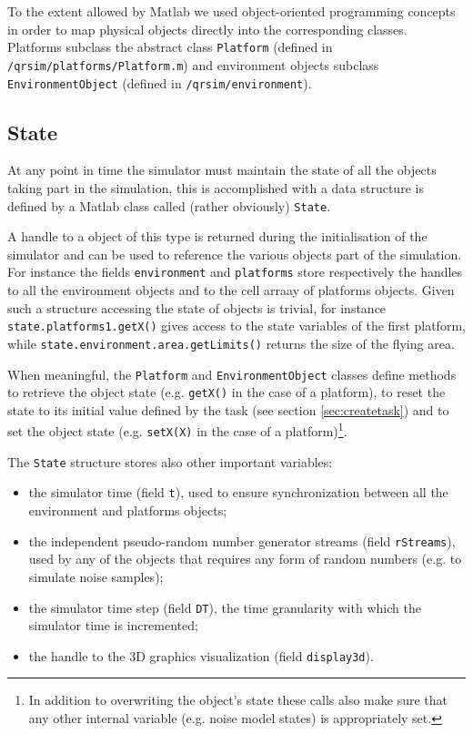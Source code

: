 \documentclass[a4paper,11pt]{report}
\begin{document}
To the extent allowed by Matlab we used object-oriented programming concepts in order to map physical objects directly into the corresponding classes. Platforms subclass the abstract class \texttt{Platform} (defined in \texttt{/qrsim/platforms/Platform.m}) and environment objects subclass \texttt{EnvironmentObject} (defined in \texttt{/qrsim/environment}).

\subsection{State}\label{sec:state}

At any point in time the simulator must maintain the state of all the objects taking part in the simulation, this is accomplished with a data structure is defined by a Matlab class called (rather obviously) \texttt{State}.
 
A handle to a object of this type is returned during the initialisation of the simulator and can be used to reference the various objects part of the simulation. For instance the fields \texttt{environment} and \texttt{platforms} store respectively the handles to all the environment objects and to the cell arraay of platforms objects. 
Given such a structure accessing the state of objects is trivial, for instance \texttt{state.platforms{1}.getX()} gives access to the state variables of the first platform, while \texttt{state.environment.area.getLimits()} returns the size of the flying area. 

When meaningful, the \texttt{Platform} and \texttt{EnvironmentObject} classes define methods to retrieve the object state (e.g. \texttt{getX()} in the case of a platform), to reset the state to its initial value defined by the task (see section \ref{sec:createtask}) and to set the object state (e.g. \texttt{setX(X)} in the case of a platform)\footnote{In addition to overwriting the object's state these calls also make sure that any other internal variable (e.g. noise model states) is appropriately set.}.

The \texttt{State} structure stores also other important variables:
\begin{itemize}
 \item the simulator time (field \texttt{t}), used to ensure synchronization between all the environment and platforms objects;
 \item the independent pseudo-random number generator streams (field \texttt{rStreams}), used by any of the objects that requires any form of random numbers (e.g. to simulate noise samples);
 \item the simulator time step (field \texttt{DT}), the time granularity with which the simulator time is incremented;
 \item the handle to the 3D graphics visualization (field \texttt{display3d}).
\end{itemize}
\end{document}
